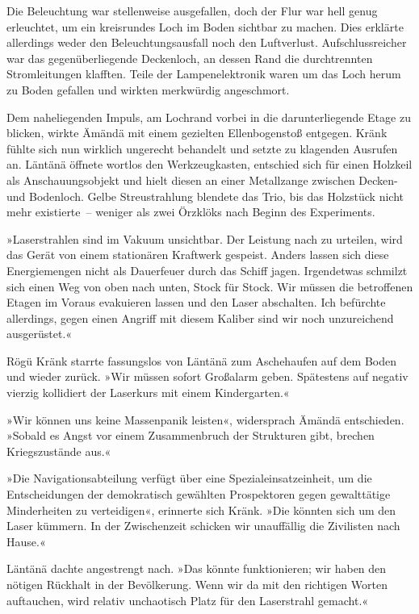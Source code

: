Die Beleuchtung war stellenweise ausgefallen, doch der Flur war hell genug erleuchtet, um ein kreisrundes Loch im Boden sichtbar zu machen. Dies erklärte allerdings weder den Beleuchtungsausfall noch den Luftverlust. Aufschlussreicher war das gegenüberliegende Deckenloch, an dessen Rand die durchtrennten Stromleitungen klafften. Teile der Lampenelektronik waren um das Loch herum zu Boden gefallen und wirkten merkwürdig angeschmort.

Dem naheliegenden Impuls, am Lochrand vorbei in die darunterliegende Etage zu blicken, wirkte Ämändä mit einem gezielten Ellenbogenstoß entgegen. Kränk fühlte sich nun wirklich ungerecht behandelt und setzte zu klagenden Ausrufen an. Läntänä öffnete wortlos den Werkzeugkasten, entschied sich für einen Holzkeil als Anschauungsobjekt und hielt diesen an einer Metallzange zwischen Decken- und Bodenloch. Gelbe Streustrahlung blendete das Trio, bis das Holzstück nicht mehr existierte~– weniger als zwei Örzklöks nach Beginn des Experiments.

»Laserstrahlen sind im Vakuum unsichtbar. Der Leistung nach zu urteilen, wird das Gerät von einem stationären Kraftwerk gespeist. Anders lassen sich diese Energiemengen nicht als Dauerfeuer durch das Schiff jagen. Irgendetwas schmilzt sich einen Weg von oben nach unten, Stock für Stock. Wir müssen die betroffenen Etagen im Voraus evakuieren lassen und den Laser abschalten. Ich befürchte allerdings, gegen einen Angriff mit diesem Kaliber sind wir noch unzureichend ausgerüstet.«

Rögü Kränk starrte fassungslos von Läntänä zum Aschehaufen auf dem Boden und wieder zurück. »Wir müssen sofort Großalarm geben. Spätestens auf negativ vierzig kollidiert der Laserkurs mit einem Kindergarten.«

»Wir können uns keine Massenpanik leisten«, widersprach Ämändä entschieden. »Sobald es Angst vor einem Zusammenbruch der Strukturen gibt, brechen Kriegszustände aus.«

»Die Navigationsabteilung verfügt über eine Spezialeinsatzeinheit, um die Entscheidungen der demokratisch gewählten Prospektoren gegen gewalttätige Minderheiten zu verteidigen«, erinnerte sich Kränk. »Die könnten sich um den Laser kümmern. In der Zwischenzeit schicken wir unauffällig die Zivilisten nach Hause.«

Läntänä dachte angestrengt nach. »Das könnte funktionieren; wir haben den nötigen Rückhalt in der Bevölkerung. Wenn wir da mit den richtigen Worten auftauchen, wird relativ unchaotisch Platz für den Laserstrahl gemacht.«

